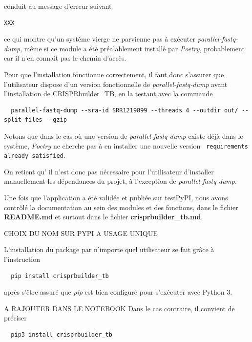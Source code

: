 \documentclass[twoside,a4paper,11pt,frenchb,openany]{report}
\begin{document}
conduit au message d'erreur suivant

\begin{verbatim}
XXX
\end{verbatim}

ce qui montre qu'un système vierge ne parvienne pas à exécuter \textit{parallel-fastq-dump}, même si ce module a été préalablement installé par \textit{Poetry}, probablement car il n'en connaît pas le chemin d'accès.

Pour que l'installation fonctionne correctement, il faut donc s'assurer que l'utilisateur dispose d'un version fonctionnelle de \textit{parallel-fastq-dump} avant l'installation de CRISPRbuilder\_TB, en la testant avec la commande 

\begin{verbatim}
  parallel-fastq-dump --sra-id SRR1219899 --threads 4 --outdir out/ --split-files --gzip
\end{verbatim} 

Notons que dans le cas où une version de \textit{parallel-fastq-dump} existe déjà dans le système, \textit{Poetry} ne cherche pas à en installer une nouvelle version \texttt{  requirements already satisfied}.

On retient qu' il n'est donc pas nécessaire pour l'utilisateur d'installer manuellement les dépendances du projet, à l'exception de \textit{parallel-fastq-dump}. 










Une fois que l'application a été validée et publiée sur testPyPI, nous avons contrôlé la documentation au sein des modules et des fonctions, dans le fichier \textbf{README.md} et surtout dans le fichier \textbf{crisprbuilder\_tb.md}. 




CHOIX DU NOM SUR PYPI A USAGE UNIQUE

L’installation du package par n'importe quel utilisateur se fait grâce à l’instruction
\begin{verbatim}  pip install crisprbuilder_tb\end{verbatim}
après s'être assuré que \textit{pip} est bien configuré pour s'exécuter avec Python 3.


A RAJOUTER DANS LE NOTEBOOK
Dans le cas contraire, il convient de préciser
\begin{verbatim}  pip3 install crisprbuilder_tb\end{verbatim}
\end{document}
